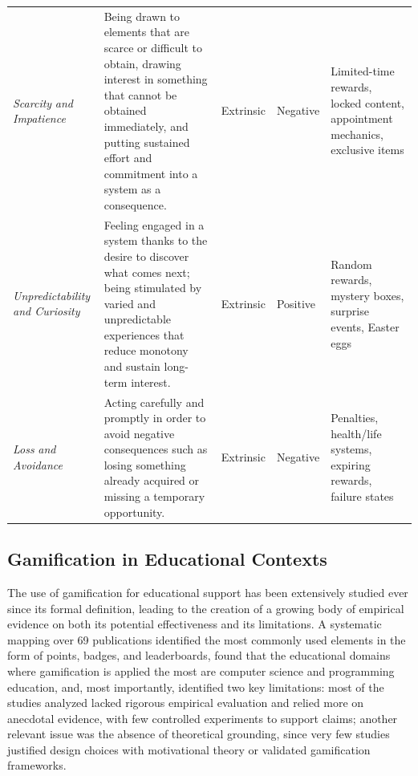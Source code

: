 \begin{table}[ht]
{\begin{tabular}{@{}p{3.2cm}p{6cm}p{2cm}p{2cm}p{4.5cm}@{}}
\emph{Scarcity} \newline \emph{and Impatience} &
Being drawn to elements that are scarce or difficult to obtain, drawing interest in something that cannot be obtained immediately, and putting sustained effort and commitment into a system as a consequence. &
Extrinsic & Negative &
Limited-time rewards, locked content, appointment mechanics, exclusive items \\
\addlinespace

\emph{Unpredictability} \newline \emph{and Curiosity} &
Feeling engaged in a system thanks to the desire to discover what comes next; being stimulated by varied and unpredictable experiences that reduce monotony and sustain long-term interest. &
Extrinsic & Positive &
Random rewards, mystery boxes, surprise events, Easter eggs \\
\addlinespace

\emph{Loss} \newline \emph{and Avoidance} &
Acting carefully and promptly in order to avoid negative consequences such as losing something already acquired or missing a temporary opportunity. &
Extrinsic & Negative &
Penalties, health/life systems, expiring rewards, failure states \\

\bottomrule
\end{tabular}%
}
\end{table}





\subsection{Gamification in Educational Contexts}

The use of gamification for educational support has been extensively studied ever since its formal definition, leading to the creation of a growing body of empirical evidence on both its potential effectiveness and its limitations. A systematic mapping over 69 publications \cite{dicheva2015gamification} identified the most commonly used elements in the form of points, badges, and leaderboards, found that the educational domains where gamification is applied the most are computer science and programming education, and, most importantly, identified two key limitations: most of the studies analyzed lacked rigorous empirical evaluation and relied more on anecdotal evidence, with few controlled experiments to support claims; another relevant issue was the absence of theoretical grounding, since very few studies justified design choices with motivational theory or validated gamification frameworks.

